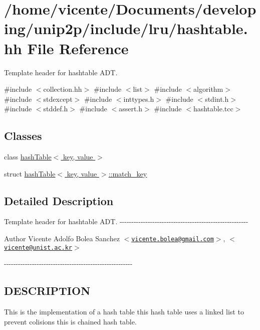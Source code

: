 \hypertarget{hashtable_8hh}{\section{/home/vicente/\-Documents/developing/unip2p/include/lru/hashtable.hh \-File \-Reference}
\label{hashtable_8hh}
}


\-Template header for hashtable \-A\-D\-T.  


{\ttfamily \#include $<$collection.\-hh$>$}\*
{\ttfamily \#include $<$list$>$}\*
{\ttfamily \#include $<$algorithm$>$}\*
{\ttfamily \#include $<$stdexcept$>$}\*
{\ttfamily \#include $<$inttypes.\-h$>$}\*
{\ttfamily \#include $<$stdint.\-h$>$}\*
{\ttfamily \#include $<$stddef.\-h$>$}\*
{\ttfamily \#include $<$assert.\-h$>$}\*
{\ttfamily \#include $<$hashtable.\-tcc$>$}\*
\subsection*{\-Classes}
\begin{DoxyCompactItemize}
\item 
class \hyperlink{classhashTable}{hash\-Table$<$ key, value $>$}
\item 
struct \hyperlink{structhashTable_1_1match__key}{hash\-Table$<$ key, value $>$\-::match\-\_\-key}
\end{DoxyCompactItemize}


\subsection{\-Detailed \-Description}
\-Template header for hashtable \-A\-D\-T. -\/-\/-\/-\/-\/-\/-\/-\/-\/-\/-\/-\/-\/-\/-\/-\/-\/-\/-\/-\/-\/-\/-\/-\/-\/-\/-\/-\/-\/-\/-\/-\/-\/-\/-\/-\/-\/-\/-\/-\/-\/-\/-\/-\/-\/-\/-\/-\/-\/-\/-\/-\/-\/-\/-\/ \begin{DoxyAuthor}{\-Author}
\-Vicente \-Adolfo \-Bolea \-Sanchez $<$\href{mailto:vicente.bolea@gmail.com}{\tt vicente.\-bolea@gmail.\-com}$>$, $<$\href{mailto:vicente@unist.ac.kr}{\tt vicente@unist.\-ac.\-kr}$>$
\end{DoxyAuthor}
-\/-\/-\/-\/-\/-\/-\/-\/-\/-\/-\/-\/-\/-\/-\/-\/-\/-\/-\/-\/-\/-\/-\/-\/-\/-\/-\/-\/-\/-\/-\/-\/-\/-\/-\/-\/-\/-\/-\/-\/-\/-\/-\/-\/-\/-\/-\/-\/-\/-\/-\/-\/-\/-\/-\/\hypertarget{lru__map_8hh_DESCRIPTION}{}\subsection{\-D\-E\-S\-C\-R\-I\-P\-T\-I\-O\-N}\label{lru__map_8hh_DESCRIPTION}
\-This is the implementation of a hash table this hash table uses a linked list to prevent colisions this is chained hash table.

